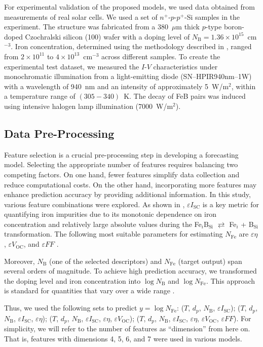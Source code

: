 \documentclass[a4paper,fleqn]{cas-sc}
\begin{document}
For experimental validation of the proposed models, we used data obtained from measurements of real solar cells.
We used a set of $n^+$-$p$-$p^+$-Si samples in the experiment.
The structure was fabricated from a 380~$\mu$m thick $p$-type boron-doped Czochralski silicon (100) wafer
with a doping level of $N_\mathrm{B}=1.36\times10^{15}$~cm$^{-3}$.
Iron concentration, determined using the methodology described in \cite{Olikh2022:JMatSci, Olikh2021JAP},
ranged from $2\times10^{11}$ to $4\times10^{13}$~cm$^{-3}$ across different samples.
To create the experimental test dataset,
we measured the $I$-$V$ characteristics under monochromatic illumination from a light-emitting diode (SN–HPIR940nm–1W)
with a wavelength of 940~nm and an intensity of approximately 5~W/m$^{2}$, within a temperature range of $(305-340)$~K.
The decay of FeB pairs was induced using intensive halogen lamp illumination (7000~W/m$^{2}$).



\subsection{Data Pre-Processing}

Feature selection is a crucial pre-processing step in developing a forecasting model.
Selecting the appropriate number of features requires balancing two competing factors.
On one hand, fewer features simplify data collection and reduce computational costs.
On the other hand, incorporating more features may enhance prediction accuracy by providing additional information.
In this study, various feature combinations were explored.
As shown in \cite{Olikh2025MSEB}, $\varepsilon I_\mathrm{SC}$ is a key metric for quantifying iron impurities
due to its monotonic dependence on iron concentration and relatively large absolute values during the
Fe$_i$B$_\mathrm{Si}$ $\rightleftarrows$ Fe$_i$ + B$_\mathrm{Si}$
transformation.
The following most suitable parameters for estimating $N_\mathrm{Fe}$ are
$\varepsilon \eta$, $\varepsilon V_\mathrm{OC}$, and $\varepsilon F\!F$ \cite{Olikh2025MSEB}.

Moreover, $N_\mathrm{B}$ (one of the selected descriptors) and
$N_\mathrm{Fe}$ (target output) span several orders of magnitude.
To achieve high prediction accuracy, we transformed the doping level and iron concentration into
$\log N_\mathrm{B}$ and $\log N_\mathrm{Fe}$.
This approach is standard for quantities that vary over a wide range \cite{Srivastava2023, Minagawa2024}.

Thus, we used the following sets to predict $y = \log N_\mathrm{Fe}$:
($T$, $d_p$, $N_\mathrm{B}$, $\varepsilon I_\mathrm{SC}$);
($T$, $d_p$, $N_\mathrm{B}$, $\varepsilon I_\mathrm{SC}$, $\varepsilon \eta$);
($T$, $d_p$, $N_\mathrm{B}$, $\varepsilon I_\mathrm{SC}$, $\varepsilon \eta$, $\varepsilon V_\mathrm{OC}$);
($T$, $d_p$, $N_\mathrm{B}$, $\varepsilon I_\mathrm{SC}$, $\varepsilon \eta$, $\varepsilon V_\mathrm{OC}$, $\varepsilon F\!F$).
For simplicity, we will refer to the number of features as ``dimension'' from here on.
That is, features with dimensions 4, 5, 6, and 7 were used in various models.
\end{document}

